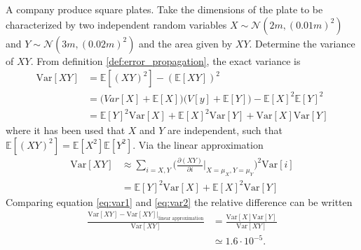 \begin{example}
	A company produce square plates. Take the dimensions of the plate to be characterized by two independent random variables $X\sim \mathcal{N}(2m,(0.01m)^2)$ and $Y\sim \mathcal{N}(3m,(0.02m)^2)$ and the area given by $XY$. Determine the variance of $XY$. From definition \ref{def:error_propagation}, the exact variance is
	\begin{equation}
		\label{eq:var1}
		\begin{split}
			\text{Var}[XY]&=\mathbb{E}[(XY)^2]-(\mathbb{E}[XY])^2\\
			&=\bigg(Var[X]+\mathbb{E}[X]\bigg)\bigg(V[y]+\mathbb{E}[Y]\bigg)-\mathbb{E}[X]^2\mathbb{E}[Y]^2\\
			&=\mathbb{E}[Y]^2\text{Var}[X]+\mathbb{E}[X]^2\text{Var}[Y]+\text{Var}[X]\text{Var}[Y]
		\end{split}
	\end{equation}
	where it has been used that $X$ and $Y$ are independent, such that $\mathbb{E}[(XY)^2]=\mathbb{E}[X^2]\mathbb{E}[Y^2]$.	Via the linear approximation
	\begin{equation}
		\label{eq:var2}
		\begin{split}
			\text{Var}[XY]&\approx\sum_{i = X,Y} \bigg( \frac{\partial (XY)}{\partial i}\bigg|_{X = \mu_X,Y = \mu_Y}  \bigg)^2\text{Var}[i]\\
			&=\mathbb{E}[Y]^2\text{Var}[X]+\mathbb{E}[X]^2\text{Var}[Y]
		\end{split}
	\end{equation}
	Comparing equation \eqref{eq:var1} and \eqref{eq:var2} the relative difference can be written
	\begin{equation}
		\begin{split}
			\frac{\text{Var}[XY]-\text{Var}[XY]|_{\text{linear approximation}}}{\text{Var}[XY]} &= \frac{\text{Var}[X]\text{Var}[Y]}{\text{Var}[XY]}\\
			& \simeq 1.6\cdot 10^{-5}.
		\end{split}
	\end{equation}
	
\end{example}

